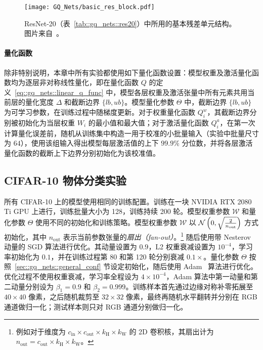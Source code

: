 \begin{figure}[htb]
  \centering
  \texttt{[image: GQ\_Nets/basic\_res\_block.pdf]}
  \caption{ResNet-20（表~\ref{tab::gq_nets::res20}）中所用的基本残差单元结构。图片来自~\citet{He_2016}。}
  \label{img::gq_nets::basic_res_block}
\end{figure}

\paragraph{量化函数}
除非特别说明，本章中所有实验都使用如下量化函数设置：模型权重及激活量化函数均为逐层非对称线性量化，即在量化函数 $Q$ 的定义~\eqref{eq::gq_nets::linear_q_func} 中，模型各层权重及激活张量中所有元素共用当前层的量化宽度 $\Delta$ 和截断边界 $\{lb, ub\}$。模型量化参数 $\Theta$ 中，截断边界 $\{lb, ub\}$ 为可学习参数，在训练过程中随梯度更新。对于权重量化函数 $Q^w_i$，其截断边界分别被初始化为当层权重 $W_i$ 的最小值和最大值；对于激活量化函数 $Q^a_i$，在第一次计算量化误差前，随机从训练集中构造一用于校准的小批量输入（实验中批量尺寸为 $64$），使用该组输入得出模型每层激活值的上下 $99.9\%$ 分位数，并将各层激活量化函数的截断上下边界分别初始化为该校准值。
\subsection{CIFAR-10 物体分类实验} \label{sec::gq_nets::cifar10_experiments}
所有 CIFAR-10 上的模型使用相同的训练配置。训练在一块 NVIDIA RTX 2080 Ti GPU 上进行，训练批量大小为 128，训练持续 200 轮。模型权重参数 $\mathcal{W}$ 和量化参数 $\Theta$ 使用不同的初始化和训练策略。模型权重参数 $\mathcal{W}$ 以 $\mathcal{N} \left( 0, \sqrt{\frac{2}{n_{\mathrm{out}}}} \right)$ 方式初始化，其中 $n_{\mathrm{out}}$ 表示当前参数张量的\emph{扇出（fan-out）}。\footnote{例如对于维度为 $c_{\mathrm{in}} \times c_{\mathrm{out}} \times k_{\mathrm{H}} \times k_{\mathrm{W}}$ 的 2D 卷积核，其扇出计为 $n_{\mathrm{out}}=c_{\mathrm{out}} \times k_{\mathrm{H}} \times k_{\mathrm{W}}$。} 随后使用带 Nesterov 动量的 SGD 算法进行优化。其动量设置为 $0.9$，L2 权重衰减设置为 $10^{-4}$，学习率初始化为 $0.1$，并在训练过程第 80 和第 120 轮分别衰减 $0.1\times$。量化参数 $\Theta$ 按照~\ref{sec::gq_nets::general_conf} 节设定初始化，随后使用 Adam~\citep{kingma2014adam} 算法进行优化。优化过程不使用权重衰减，学习率全程设为 $4\times 10^{-4}$，Adam 算法中第一动量和第二动量分别设为 $\beta_1 = 0.9$ 和 $\beta_2 = 0.999$。训练样本首先通过边缘对称补零拓展至 $40\times40$ 像素，之后随机裁剪至 $32\times 32$ 像素，最终再随机水平翻转并分别在 RGB 通道做归一化；测试样本则只对 RGB 通道分别做归一化。


